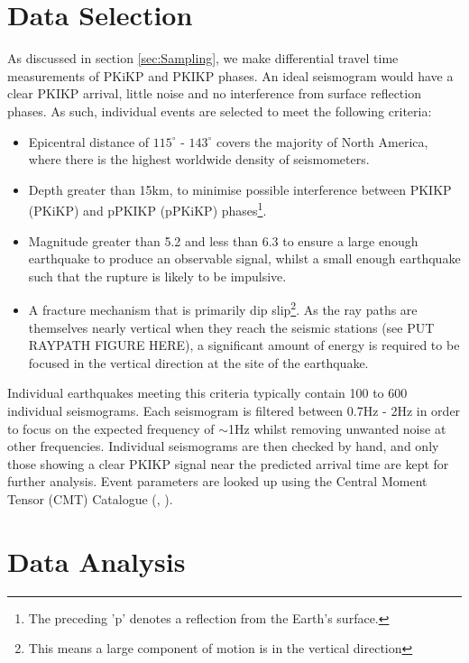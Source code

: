 \documentclass[11pt,a4paper]{article}
\begin{document}
\section{Data Selection}
\label{sec:Data}
As discussed in section \ref{sec:Sampling}, we make differential travel time measurements of PKiKP and PKIKP phases. An ideal seismogram would have a clear PKIKP arrival, little noise and no interference from surface reflection phases. As such, individual events are selected to meet the following criteria:

\begin{itemize}
	\item Epicentral distance of $115^{\circ}$ - $143^{\circ}$ covers the majority of North America, where there is the highest worldwide density of seismometers.
	\item  Depth greater than 15km, to minimise possible interference between PKIKP (PKiKP) and pPKIKP (pPKiKP) phases\footnote{The preceding 'p' denotes a reflection from the Earth's surface.}.
	\item Magnitude greater than 5.2 and less than 6.3 to ensure a large enough earthquake to produce an observable signal, whilst a small enough earthquake such that the rupture is likely to be impulsive.
	\item A fracture mechanism that is primarily dip slip\footnote{This means a large component of motion is in the vertical direction}. As the ray paths are themselves nearly vertical when they reach the seismic stations (see PUT RAYPATH FIGURE HERE), a significant amount of energy is required to be focused in the vertical direction at the site of the earthquake.
\end{itemize}

Individual earthquakes meeting this criteria typically contain 100 to 600 individual seismograms. Each seismogram is filtered between 0.7Hz - 2Hz in order to focus on the expected frequency of $\sim$1Hz whilst removing unwanted noise at other frequencies. Individual seismograms are then checked by hand, and only those showing a clear PKIKP signal near the predicted arrival time are kept for further analysis. Event parameters are looked up using the Central Moment Tensor (CMT) Catalogue (\cite{Dziewonski1981}, \cite{Ekstrom2012}).

\section{Data Analysis}
\end{document}
